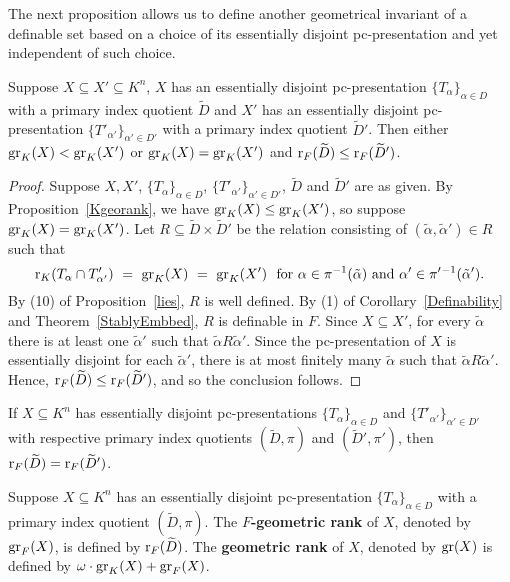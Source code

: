The next proposition allows us to define another geometrical invariant of a definable set based on a choice of its essentially disjoint pc-presentation and yet independent of such choice.

\begin{prop} \label{Fgeorank}
Suppose $X \subseteq X' \subseteq K^n$, $X$ has an essentially disjoint pc-presentation $\{ T_\alpha\}_{ \alpha \in D}$ with  a primary index quotient $\widetilde{D}$ and $X'$ has an essentially disjoint pc-presentation $\{ T'_{\alpha'}\}_{ \alpha' \in D'}$ with a primary index quotient $\widetilde{D}'$. Then either $\mathrm{gr}_K(X)< \mathrm{gr}_K(X')$ or $\mathrm{gr}_K(X)= \mathrm{gr}_K(X')$ and $\mathrm{r}_F(\widetilde{D}) \leq \mathrm{r}_F(\widetilde{D}')$.
\end{prop}

\begin{proof}
Suppose $X, X'$, $\{ T_\alpha\}_{ \alpha \in D}$, $\{ T'_{\alpha'}\}_{ \alpha' \in D'}$, $\widetilde{D}$ and $\widetilde{D}'$ are as given.
By Proposition~\ref{Kgeorank}, we have $\mathrm{gr}_K(X) \leq \mathrm{gr}_K(X')$, so suppose $\mathrm{gr}_K(X) = \mathrm{gr}_K(X')$.
Let  $\displaystyle R \subseteq \widetilde{D} \times \widetilde{D}'$ be the relation consisting of $(\tilde{\alpha}, \tilde{\alpha}') \in R$  such that
$$  \mathrm{r}_K( T_{\alpha} \cap T'_{\alpha'})\ =\ \mathrm{gr}_K(X)\ =\ \mathrm{gr}_K(X')\ \text{ for } \alpha \in \pi^{-1}(\tilde{\alpha}) \text{ and } \alpha' \in \pi'{}^{-1}(\tilde{\alpha}'). $$ By (10) of Proposition~\ref{lies}, $R$ is well defined. By (1) of Corollary~\ref{Definability}  and Theorem~\ref{StablyEmbbed}, $R$ is definable in $F$.
Since $ X\subseteq X'$,  for every $ \tilde{\alpha}$ there is at least one $ \tilde{\alpha}' $ such that $  \tilde{\alpha} R \tilde{\alpha}' $.
Since the pc-presentation of $X$ is essentially disjoint for each $  \tilde{\alpha}'$, there is at most finitely many $ \tilde{\alpha}$ such that $ \tilde{\alpha} R \tilde{\alpha}'$.
Hence, $ \mathrm{r}_F (\widetilde{D}) \leq  \mathrm{r}_F (\widetilde{D}') $, and so the conclusion follows.
\end{proof}

\begin{cor}
If $X \subseteq K^n$ has essentially disjoint pc-presentations $\{ T_\alpha\}_{ \alpha \in D}$ and $\{ T'_{\alpha'}\}_{ \alpha' \in D'}$ with respective primary index quotients $(\widetilde{D}, \pi)$ and  $(\widetilde{D}', \pi')$, then $\mathrm{r}_F(\widetilde{D})= \mathrm{r}_F(\widetilde{D}')$.
\end{cor}


\noindent
Suppose $X \subseteq K^n$ has an essentially disjoint pc-presentation $\{ T_\alpha\}_{ \alpha \in D}$ with a primary index quotient $(\widetilde{D}, \pi)$. The { \bf $F$-geometric rank} of $X$, denoted by $\mathrm{gr}_F(X)$, is defined by $\mathrm{r}_F(\widetilde{D})$. The {\bf geometric rank} of $X$, denoted by $\mathrm{gr}(X)$ is defined by $\omega\cdot \mathrm{gr}_K(X)+ \mathrm{gr}_F(X)$.





